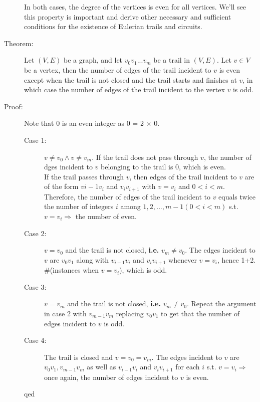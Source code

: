 \documentclass[10pt]{article}
\begin{document}
\begin{description}
\begin{enumerate}
\begin{figure}[h!]
			\end{figure}
		\end{enumerate}
		In both cases, the degree of the vertices is even for all vertices. We'll see this property is important and derive other necessary and sufficient conditions for the existence of Eulerian trails and circuits.
		\item[Theorem:] Let $(V, E)$ be a graph, and let $v_0 v_1 ... v_m$ be a trail in $(V, E)$. Let $v \in V$ be a vertex, then the number of edges of the trail incident to $v$ is even except when the trail is not closed and the trail starts and finishes at $v$, in which case the number of edges of the trail incident to the vertex $v$ is odd.
		\item[Proof:] Note that 0 is an even integer as 0 = 2 $\times$ 0.
		\begin{description}
			\item[Case 1:] $v \neq v_0 \land v \neq v_m$. If the trail does not pass through $v$, the number of dges incident to $v$ belonging to the trail is 0, which is even. \\
			If the trail passes through $v$, then edges of the trail incident to $v$ are of the form $v{i-1} v_i$ and $v_i v_{i+1}$ with $v = v_i$ and $0 < i < m$. Therefore, the number of edges of the trail incident to $v$ equals twice the number of integers $i$ among $1, 2, ..., m-1 (0 < i < m)$ s.t. $v= v_i \Rightarrow$ the number of even.
			\item[Case 2:] $v = v_0$ and the trail is not closed, \textbf{i.e.} $v_m \neq v_0$. The edges incident to $v$ are $v_0 v_1$ along with $v_{i-1} v_i$ and $v_i v_{i+1}$ whenever $v=v_i$, hence 1+2. $\#$(instances when $v=v_i$), which is odd.
			\item[Case 3:] $v=v_m$ and the trail is not closed, \textbf{i.e.} $v_m \neq v_0$. Repeat the argument in case 2 with $v_{m-1} v_m$ replacing $v_0 v_1$ to get that the number of edges incident to $v$ is odd.
			\item[Case 4:] The trail is closed and $v = v_0 = v_m$. The edges incident to $v$ are $v_0 v_1, v_{m-1} v_m$ as well as $v_{i-1} v_i$ and $v_i v_{i+1}$ for each $i$ s.t. $v=v_i \Rightarrow$ once again, the number of edges incident to $v$ is even.
			\item[qed]
		\end{description}

\end{description}
\end{document}
